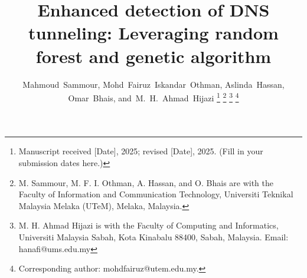 \documentclass[journal]{IAENGtran}
\begin{document}
%
\title{Enhanced detection of DNS tunneling: Leveraging random forest and genetic algorithm}
%
%
%

\author{Mahmoud~Sammour,
        Mohd~Fairuz~Iskandar~Othman,
        Aslinda~Hassan,
        Omar~Bhais,
        and~M.~H.~Ahmad~Hijazi%
\thanks{Manuscript received [Date], 2025; revised [Date], 2025. (Fill in your submission dates here.)}%
\thanks{M. Sammour, M. F. I. Othman, A. Hassan, and O. Bhais are with the Faculty of Information and Communication Technology, Universiti Teknikal Malaysia Melaka (UTeM), Melaka, Malaysia.}%
\thanks{M. H. Ahmad Hijazi is with the Faculty of Computing and Informatics, Universiti Malaysia Sabah, Kota Kinabalu 88400, Sabah, Malaysia. Email: hanafi@ums.edu.my}%
\thanks{Corresponding author: mohdfairuz@utem.edu.my.}%
}


%
%



%
\end{document}
